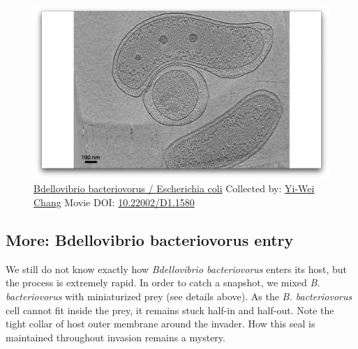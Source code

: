 \documentclass[]{tufte-book}
\begin{document}
\begin{figure}
\includegraphics{movie_stills/9_10} \caption[\protect\hyperlink{tree}{Bdellovibrio bacteriovorus /
Escherichia coli} Collected by: \protect\hyperlink{yi-wei_chang}{Yi-Wei
Chang} Movie DOI:
\href{https://doi.org/10.22002/D1.1580}{10.22002/D1.1580}]{\protect\hyperlink{tree}{Bdellovibrio bacteriovorus /
Escherichia coli} Collected by: \protect\hyperlink{yi-wei_chang}{Yi-Wei
Chang} Movie DOI:
\href{https://doi.org/10.22002/D1.1580}{10.22002/D1.1580}}\label{fig:9-10}
\end{figure}

\hypertarget{Bdellovibrio_bacteriovorus_entry}{\subsection*{More:
Bdellovibrio bacteriovorus
entry}\label{Bdellovibrio_bacteriovorus_entry}}

We still do not know exactly how \emph{Bdellovibrio bacteriovorus}
enters its host, but the process is extremely rapid. In order to catch a
snapshot, we mixed \emph{B. bacteriovorus} with miniaturized prey (see
details above). As the \emph{B. bacteriovorus} cell cannot fit inside
the prey, it remains stuck half-in and half-out. Note the tight collar
of host outer membrane around the invader. How this seal is maintained
throughout invasion remains a mystery.
\end{document}
